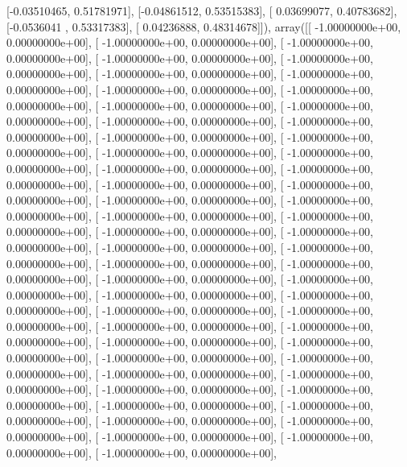 \documentclass{article}
\begin{document}
       [-0.03510465,  0.51781971],
       [-0.04861512,  0.53515383],
       [ 0.03699077,  0.40783682],
       [-0.0536041 ,  0.53317383],
       [ 0.04236888,  0.48314678]]), array([[ -1.00000000e+00,   0.00000000e+00],
       [ -1.00000000e+00,   0.00000000e+00],
       [ -1.00000000e+00,   0.00000000e+00],
       [ -1.00000000e+00,   0.00000000e+00],
       [ -1.00000000e+00,   0.00000000e+00],
       [ -1.00000000e+00,   0.00000000e+00],
       [ -1.00000000e+00,   0.00000000e+00],
       [ -1.00000000e+00,   0.00000000e+00],
       [ -1.00000000e+00,   0.00000000e+00],
       [ -1.00000000e+00,   0.00000000e+00],
       [ -1.00000000e+00,   0.00000000e+00],
       [ -1.00000000e+00,   0.00000000e+00],
       [ -1.00000000e+00,   0.00000000e+00],
       [ -1.00000000e+00,   0.00000000e+00],
       [ -1.00000000e+00,   0.00000000e+00],
       [ -1.00000000e+00,   0.00000000e+00],
       [ -1.00000000e+00,   0.00000000e+00],
       [ -1.00000000e+00,   0.00000000e+00],
       [ -1.00000000e+00,   0.00000000e+00],
       [ -1.00000000e+00,   0.00000000e+00],
       [ -1.00000000e+00,   0.00000000e+00],
       [ -1.00000000e+00,   0.00000000e+00],
       [ -1.00000000e+00,   0.00000000e+00],
       [ -1.00000000e+00,   0.00000000e+00],
       [ -1.00000000e+00,   0.00000000e+00],
       [ -1.00000000e+00,   0.00000000e+00],
       [ -1.00000000e+00,   0.00000000e+00],
       [ -1.00000000e+00,   0.00000000e+00],
       [ -1.00000000e+00,   0.00000000e+00],
       [ -1.00000000e+00,   0.00000000e+00],
       [ -1.00000000e+00,   0.00000000e+00],
       [ -1.00000000e+00,   0.00000000e+00],
       [ -1.00000000e+00,   0.00000000e+00],
       [ -1.00000000e+00,   0.00000000e+00],
       [ -1.00000000e+00,   0.00000000e+00],
       [ -1.00000000e+00,   0.00000000e+00],
       [ -1.00000000e+00,   0.00000000e+00],
       [ -1.00000000e+00,   0.00000000e+00],
       [ -1.00000000e+00,   0.00000000e+00],
       [ -1.00000000e+00,   0.00000000e+00],
       [ -1.00000000e+00,   0.00000000e+00],
       [ -1.00000000e+00,   0.00000000e+00],
       [ -1.00000000e+00,   0.00000000e+00],
       [ -1.00000000e+00,   0.00000000e+00],
       [ -1.00000000e+00,   0.00000000e+00],
       [ -1.00000000e+00,   0.00000000e+00],
       [ -1.00000000e+00,   0.00000000e+00],
       [ -1.00000000e+00,   0.00000000e+00],
       [ -1.00000000e+00,   0.00000000e+00],
       [ -1.00000000e+00,   0.00000000e+00],
       [ -1.00000000e+00,   0.00000000e+00],
       [ -1.00000000e+00,   0.00000000e+00],
       [ -1.00000000e+00,   0.00000000e+00],
       [ -1.00000000e+00,   0.00000000e+00],
\end{document}
